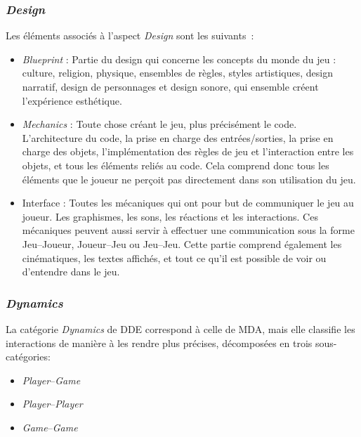 

\goodbreak

\begin{samepage}

\subsubsection*{\emph{Design}}

Les \'el\'ements associ\'es \`a l'aspect \emph{Design} sont les suivants~: 
    \begin{itemize}
\item \emph{Blueprint} : Partie du design qui concerne les concepts du monde du jeu : culture, religion, physique, ensembles de règles, styles artistiques, design narratif, design de personnages et design sonore, qui ensemble créent l'expérience esthétique.
\item \emph{Mechanics} : Toute chose créant le jeu, plus précisément le code. L'architecture du code, la prise en charge des entrées/sorties, la prise en charge des objets, l'implémentation des règles de jeu et l'interaction entre les objets, et tous les éléments reliés au code. Cela comprend donc tous les éléments que le joueur ne perçoit pas directement dans son utilisation du jeu.
\item Interface : Toutes les mécaniques qui ont pour but
    de communiquer le jeu au joueur. Les graphismes, les sons, les
    réactions et les interactions. Ces mécaniques peuvent aussi servir
    à effectuer une communication sous la forme
    Jeu--Joueur, Joueur--Jeu ou
    Jeu--Jeu. Cette partie comprend également les
    cinématiques, les textes affichés, et tout ce qu'il est possible
    de voir ou d'entendre dans le jeu.
\end{itemize}

\end{samepage}

\subsubsection*{\emph{Dynamics}} 

La catégorie \emph{Dynamics} de DDE correspond à celle de MDA, mais elle classifie les interactions de manière à les rendre plus précises, d\'ecompos\'ees en trois sous-catégories: 

    \begin{itemize}
        \item \emph{Player}--\emph{Game}
        \item \emph{Player}--\emph{Player}
        \item \emph{Game}--\emph{Game}
    \end{itemize}

